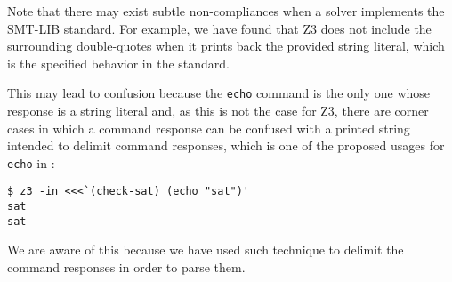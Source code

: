Note that there may exist subtle non-compliances when a solver implements the
SMT-LIB standard. For example, we have found that Z3 does not include the
surrounding double-quotes when it prints back the provided string literal, which
is the specified behavior in the standard.

This may lead to confusion because the \verb|echo| command is the only one whose
response is a string literal and, as this is not the case for Z3, there are 
corner cases in which a command response can be confused with a printed string
intended to delimit command responses, which is one of the proposed usages for
\verb|echo| in \cite{smtLibStandard}:

\begin{verbatim}
$ z3 -in <<<`(check-sat) (echo "sat")'
sat
sat
\end{verbatim}

We are aware of this because we have used such technique to delimit the command 
responses in order to parse them.
